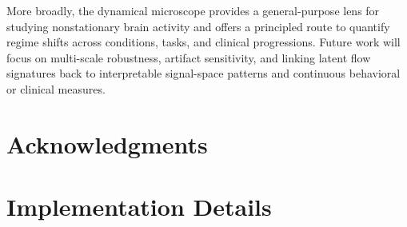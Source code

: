 \documentclass[5p,twocolumn,authoryear]{elsarticle}
\begin{document}
More broadly, the dynamical microscope provides a general-purpose lens for studying nonstationary brain activity and offers a principled route to quantify regime shifts across conditions, tasks, and clinical progressions. Future work will focus on multi-scale robustness, artifact sensitivity, and linking latent flow signatures back to interpretable signal-space patterns and continuous behavioral or clinical measures.

\section*{Acknowledgments}

\appendix
\section{Implementation Details}
\label{app:implementation}
\end{document}
